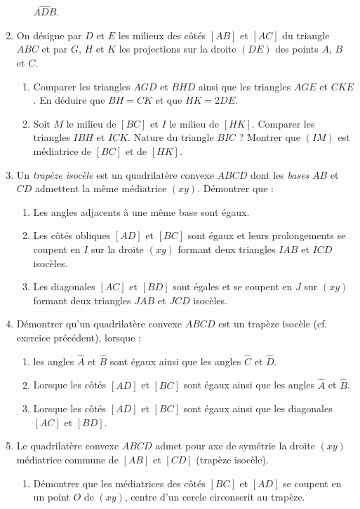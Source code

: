 \begin{enumerate}
\begin{enumerate}
$\widehat{ADB}$. 
\end{enumerate}
\item On désigne par $D$ et $E$ les milieux des côtés $[AB]$ et $[AC]$ du triangle $ABC$ et par $G$, $H$ et $K$ les projections sur la droite $(DE)$ des points $A$, $B$ et $C$. \begin{enumerate}
\item Comparer les triangles $AGD$ et $BHD$ ainsi que les triangles $AGE$ et $CKE$. 
En déduire que $BH=CK$ et que $HK=2DE$. 
\item Soit $M$ le milieu de $[BC]$ et $I$ le milieu de $[HK]$. Comparer les triangles $IBH$ et $ICK$. Nature du triangle $BIC$ ? Montrer que $(IM)$ est médiatrice de $[BC]$ et de $[HK]$. 
\end{enumerate}
\item Un \emph{trapèze isocèle} est un quadrilatère convexe $ABCD$ dont les \emph{bases} $AB$ et $CD$ admettent la même médiatrice $(xy)$. Démontrer que : 
\begin{enumerate}
\item Les angles adjacents à une même base sont égaux. 
\item Les côtés obliques $[AD]$ et $[BC]$ sont égaux et leurs prolongements se coupent en $I$ sur la droite $(xy)$ formant deux triangles $IAB$ et $ICD$ isocèles. 
\item Les diagonales $[AC]$ et $[BD]$ sont égales et se coupent en $J$ sur $(xy)$
formant deux triangles $JAB$ et $JCD$ isocèles.
\end{enumerate}
\item Démontrer qu'un quadrilatère convexe $ABCD$ est un trapèze isocèle (cf. exercice précédent), lorsque : \begin{enumerate}
\item les angles $\widehat{A}$ et $\widehat{B}$ sont égaux ainsi que les angles 
$\widehat{C}$ et $\widehat{D}$. 
\item Lorsque les côtés $[AD]$ et $[BC]$ sont égaux ainsi que les angles $\widehat{A}$ et $\widehat{B}$.
\item Lorsque les côtés $[AD]$ et $[BC]$ sont égaux ainsi que les diagonales $[AC]$ et $[BD]$.
\end{enumerate}
\item Le quadrilatère convexe $ABCD$ admet pour axe de symétrie la droite $(xy)$ médiatrice commune de $[AB]$ et $[CD]$ (trapèze isocèle). \begin{enumerate}
\item Démontrer que les médiatrices des côtés $[BC]$ et $[AD]$ se coupent en un point $O$ de $(xy)$, centre d'un cercle circonscrit au trapèze. 

\end{enumerate}
\end{enumerate}
